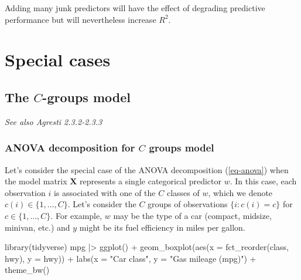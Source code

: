 \documentclass[
  11pt,
  letterpaper,
  oneside]{book}
\newenvironment{Shaded}{\begin{snugshade}}{\end{snugshade}}
\newcommand{\AttributeTok}[1]{\textcolor[rgb]{0.40,0.45,0.13}{#1}}
\newcommand{\FunctionTok}[1]{\textcolor[rgb]{0.28,0.35,0.67}{#1}}
\newcommand{\NormalTok}[1]{\textcolor[rgb]{0.00,0.23,0.31}{#1}}
\newcommand{\SpecialCharTok}[1]{\textcolor[rgb]{0.37,0.37,0.37}{#1}}
\newcommand{\StringTok}[1]{\textcolor[rgb]{0.13,0.47,0.30}{#1}}
\theoremstyle{definition}
\theoremstyle{plain}
\theoremstyle{plain}
\theoremstyle{plain}
\theoremstyle{remark}
\begin{document}
Adding many junk predictors will have the effect of degrading predictive
performance but will nevertheless increase \(R^2\).

\hypertarget{special-cases}{%
\section{Special cases}\label{special-cases}}

\hypertarget{the-c-groups-model}{%
\subsection{\texorpdfstring{The \(C\)-groups
model}{The C-groups model}}\label{the-c-groups-model}}

\emph{See also Agresti 2.3.2-2.3.3}

\hypertarget{anova-decomposition-for-c-groups-model}{%
\subsubsection{\texorpdfstring{ANOVA decomposition for \(C\) groups
model}{ANOVA decomposition for C groups model}}\label{anova-decomposition-for-c-groups-model}}

Let's consider the special case of the ANOVA decomposition
(\ref{eq-anova}) when the model matrix \(\boldsymbol{X}\) represents a
single categorical predictor \(w\). In this case, each observation \(i\)
is associated with one of the \(C\) classes of \(w\), which we denote
\(c(i) \in \{1, \dots, C\}\). Let's consider the \(C\) groups of
observations \(\{i: c(i) = c\}\) for \(c \in \{1, \dots, C\}\). For
example, \(w\) may be the type of a car (compact, midsize, minivan,
etc.) and \(y\) might be its fuel efficiency in miles per gallon.

\begin{Shaded}
\begin{Highlighting}[]
\FunctionTok{library}\NormalTok{(tidyverse)}
\NormalTok{mpg }\SpecialCharTok{|\textgreater{}}
  \FunctionTok{ggplot}\NormalTok{() }\SpecialCharTok{+}
  \FunctionTok{geom\_boxplot}\NormalTok{(}\FunctionTok{aes}\NormalTok{(}\AttributeTok{x =} \FunctionTok{fct\_reorder}\NormalTok{(class, hwy), }\AttributeTok{y =}\NormalTok{ hwy)) }\SpecialCharTok{+}
  \FunctionTok{labs}\NormalTok{(}\AttributeTok{x =} \StringTok{"Car class"}\NormalTok{, }\AttributeTok{y =} \StringTok{"Gas mileage (mpg)"}\NormalTok{) }\SpecialCharTok{+} 
  \FunctionTok{theme\_bw}\NormalTok{()}
\end{Highlighting}
\end{Shaded}
\end{document}
